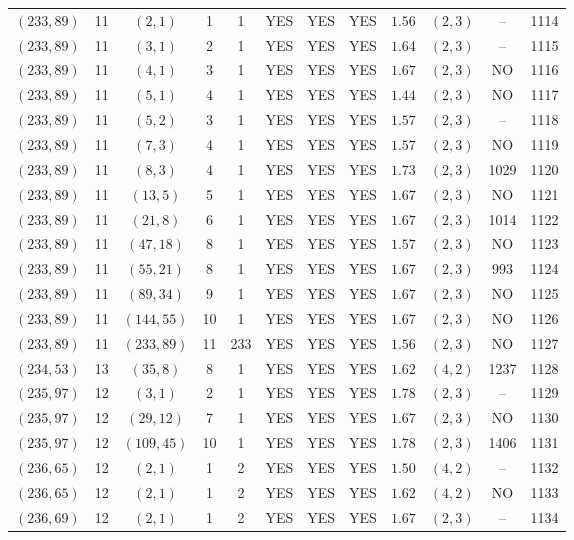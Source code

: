 \begin{longtable}{|c|c|c|c|c|c|c|c|c|c|c|c|}
$(233,89)$ & 11 & $(2,1)$ & 1 & 1 & YES & YES & YES & $1.56$ & $(2,3)$ & -- & 1114\\
$(233,89)$ & 11 & $(3,1)$ & 2 & 1 & YES & YES & YES & $1.64$ & $(2,3)$ & -- & 1115\\
$(233,89)$ & 11 & $(4,1)$ & 3 & 1 & YES & YES & YES & $1.67$ & $(2,3)$ & NO & 1116\\
$(233,89)$ & 11 & $(5,1)$ & 4 & 1 & YES & YES & YES & $1.44$ & $(2,3)$ & NO & 1117\\
$(233,89)$ & 11 & $(5,2)$ & 3 & 1 & YES & YES & YES & $1.57$ & $(2,3)$ & -- & 1118\\
$(233,89)$ & 11 & $(7,3)$ & 4 & 1 & YES & YES & YES & $1.57$ & $(2,3)$ & NO & 1119\\
$(233,89)$ & 11 & $(8,3)$ & 4 & 1 & YES & YES & YES & $1.73$ & $(2,3)$ & 1029 & 1120\\
$(233,89)$ & 11 & $(13,5)$ & 5 & 1 & YES & YES & YES & $1.67$ & $(2,3)$ & NO & 1121\\
$(233,89)$ & 11 & $(21,8)$ & 6 & 1 & YES & YES & YES & $1.67$ & $(2,3)$ & 1014 & 1122\\
$(233,89)$ & 11 & $(47,18)$ & 8 & 1 & YES & YES & YES & $1.57$ & $(2,3)$ & NO & 1123\\
$(233,89)$ & 11 & $(55,21)$ & 8 & 1 & YES & YES & YES & $1.67$ & $(2,3)$ & 993 & 1124\\
$(233,89)$ & 11 & $(89,34)$ & 9 & 1 & YES & YES & YES & $1.67$ & $(2,3)$ & NO & 1125\\
$(233,89)$ & 11 & $(144,55)$ & 10 & 1 & YES & YES & YES & $1.67$ & $(2,3)$ & NO & 1126\\
$(233,89)$ & 11 & $(233,89)$ & 11 & 233 & YES & YES & YES & $1.56$ & $(2,3)$ & NO & 1127\\
$(234,53)$ & 13 & $(35,8)$ & 8 & 1 & YES & YES & YES & $1.62$ & $(4,2)$ & 1237 & 1128\\
$(235,97)$ & 12 & $(3,1)$ & 2 & 1 & YES & YES & YES & $1.78$ & $(2,3)$ & -- & 1129\\
$(235,97)$ & 12 & $(29,12)$ & 7 & 1 & YES & YES & YES & $1.67$ & $(2,3)$ & NO & 1130\\
$(235,97)$ & 12 & $(109,45)$ & 10 & 1 & YES & YES & YES & $1.78$ & $(2,3)$ & 1406 & 1131\\
$(236,65)$ & 12 & $(2,1)$ & 1 & 2 & YES & YES & YES & $1.50$ & $(4,2)$ & -- & 1132\\
$(236,65)$ & 12 & $(2,1)$ & 1 & 2 & YES & YES & YES & $1.62$ & $(4,2)$ & NO & 1133\\
$(236,69)$ & 12 & $(2,1)$ & 1 & 2 & YES & YES & YES & $1.67$ & $(2,3)$ & -- & 1134\\

\end{longtable}
